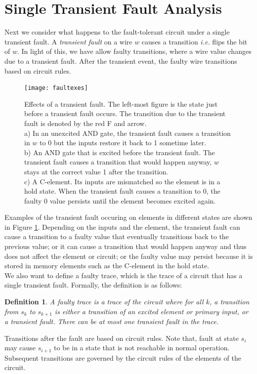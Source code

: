 \documentclass[12pt]{report}
\newtheorem*{definition}{Definition}
\begin{document}
\section{Single Transient Fault Analysis}
Next we consider what happens to the fault-tolerant circuit under a single transient fault.  A {\em transient fault} on a wire $w$ causes a transition {\em i.e.} flips the bit of $w$.  In light of this, we have allow faulty transitions, where a wire value changes due to a transient fault.  After the transient event, the faulty wire transitions based on circuit rules.  %
\begin{figure}
  \centering
    \texttt{[image: faultexes]}
  \caption[Effects of a transient fault]{Effects of a transient fault.  The left-most figure is the state just before a transient fault occurs.  The transition due to the transient fault is denoted by the red F and arrow.   \\
  a) In an unexcited AND gate, the transient fault causes a transition in $w$ to 0 but the inputs restore it back to 1 sometime later.   \\
  b) An AND gate that is excited before the transient fault.  The transient fault causes a transition that would happen anyway, $w$ stays at the correct value 1 after the transition.\\
  c) A C-element.  Its inputs are mismatched so the element is in a hold state.  When the transient fault causes a transition to 0, the faulty 0 value persists until the element becomes excited again.
  }
  \label{fig:faultx}
\end{figure}
Examples of the transient fault occuring on elements in different states are shown in Figure \ref{fig:faultx}.  Depending on the inputs and the element, the transient fault can cause a transition to a faulty value that eventually transitions back to the previous value; or it can cause a transition that would happen anyway and thus does not affect the element or circuit; or the faulty value may persist because it is stored in memory elements such as the C-element in the hold state.\\

We also want to define a faulty trace, which is the trace of a circuit that has a single transient fault.  Formally, the definition is as follows:
\begin{definition}
A {\em faulty trace} is a trace of the circuit where for all $k$, a transition from $s_k$ to $s_{k+1}$ is either a transition of an excited element or primary input, or a transient fault.  There can be at most one transient fault in the trace.
\end{definition}
Transitions after the fault are based on circuit rules.  Note that, fault at state $s_i$ may cause $s_{i+1}$ to be in a state that is not reachable in normal operation.  Subsequent transitions are governed by the circuit rules of the elements of the circuit.\\ %
\end{document}
